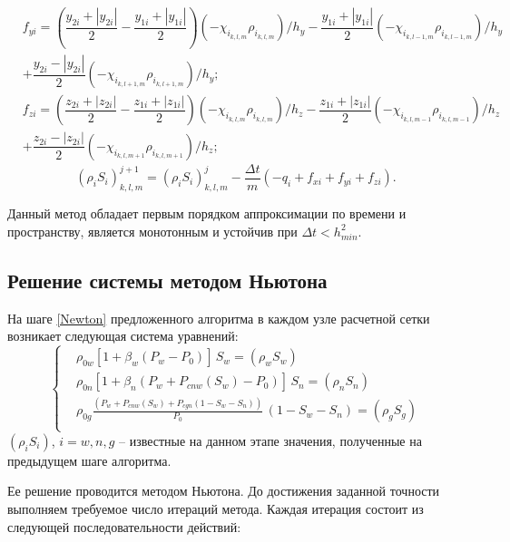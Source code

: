 \begin{eqnarray*}
    &f_{yi}= \left( \dfrac{y_{2i}+|y_{2i}|}{2} - \dfrac{y_{1i}+|y_{1i}|}{2} \right)(-\chi_{i_{k,l,m}} \rho_{i_{k,l,m}}) / h_y
    - \dfrac{y_{1i}+|y_{1i}|}{2} (-\chi_{i_{k,l-1,m}} \rho_{i_{k,l-1,m}}) / h_y \\
    & +  \dfrac{y_{2i}-|y_{2i}|}{2} (-\chi_{i_{k,l+1,m}} \rho_{i_{k,l+1,m}}) / h_y;
\end{eqnarray*}
\begin{eqnarray*}
    &f_{zi}= \left( \dfrac{z_{2i}+|z_{2i}|}{2} - \dfrac{z_{1i}+|z_{1i}|}{2} \right)(-\chi_{i_{k,l,m}} \rho_{i_{k,l,m}}) / h_z
    - \dfrac{z_{1i}+|z_{1i}|}{2} (-\chi_{i_{k,l,m-1}} \rho_{i_{k,l,m-1}}) / h_z \\
    & +  \dfrac{z_{2i}-|z_{2i}|}{2} (-\chi_{i_{k,l,m+1}} \rho_{i_{k,l,m+1}}) / h_z;
\end{eqnarray*}
\begin{equation*}
    (\rho_i S_i)^{j+1}_{k,l,m}=(\rho_i S_i)^{j}_{k,l,m}-\frac{\Delta t}{m}(-q_i+f_{xi}+f_{yi}+f_{zi}).
\end{equation*}

Данный метод обладает первым порядком аппроксимации по времени и пространству, 
является монотонным и устойчив при $\Delta t < h_{min}^2$. 

\newpage
\subsection{Решение системы методом Ньютона} На шаге \ref{Newton}
предложенного алгоритма в каждом узле расчетной сетки возникает следующая система 
уравнений: 
\begin{equation}
\left\{
  \begin{aligned}
    &\rho_{0w}[1+\beta_w (P_w-P_0)]\, S_w=(\rho_w S_w) \\
    &\rho_{0n}[1+\beta_n (P_w+P_{cnw}(S_w)-P_0)]\, S_n=(\rho_n S_n) \\
    &\rho_{0g}\frac{(P_w+P_{cnw}(S_w)+P_{cgn}(1-S_w-S_n))}{P_0}\, (1-S_w-S_n)=(\rho_g S_g) \\
  \end{aligned}
\right.
\end{equation}
$(\rho_i S_i)$,\; $i=w,n,g$ -- известные на данном этапе значения, полученные на
предыдущем шаге алгоритма.

Ее решение проводится методом Ньютона.
До достижения заданной точности выполняем требуемое число итераций метода. Каждая итерация 
состоит из следующей последовательности действий:


